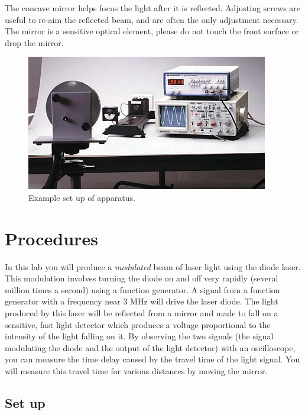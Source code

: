 \documentclass{tufte-handout}
\begin{document}
The concave mirror helps focus the light after it is reflected.  Adjusting screws are useful to re-aim the reflected beam, and are often the only adjustment necessary.  The mirror is a sensitive optical element, please do not touch the front surface or drop the mirror.

\begin{figure}
\includegraphics{../images/AP8586.jpg}
\caption{Example set up of apparatus.}
\end{figure}

\section{Procedures}

In this lab you will produce a {\em modulated} beam of laser light using the diode laser.  This modulation involves turning the diode on and off very rapidly (several million times a second) using a function generator.  A signal from a function generator with a frequency near 3 MHz will drive the laser diode.  The light produced by this laser will be reflected from a mirror and made to fall on a sensitive, fast light detector which produces a voltage proportional to the intensity of the light falling on it.  By observing the two signals (the signal modulating the diode and the output of the light detector) with an oscilloscope, you can measure the time delay caused by the travel time of the light signal.  You will measure this travel time for various distances by moving the mirror.

\subsection{Set up}
\end{document}
